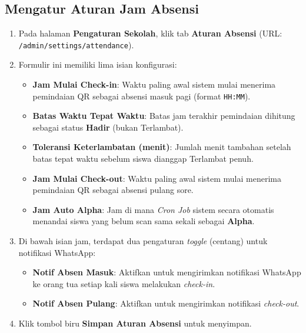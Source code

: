 \subsection{Mengatur Aturan Jam Absensi}
\begin{enumerate}
    \item Pada halaman \textbf{Pengaturan Sekolah}, klik tab \textbf{Aturan Absensi} (URL: \texttt{/admin/settings/attendance}).
    \item Formulir ini memiliki lima isian konfigurasi:
    \begin{itemize}
        \item \textbf{Jam Mulai Check-in}: Waktu paling awal sistem mulai menerima pemindaian QR sebagai absensi masuk pagi (format \texttt{HH:MM}).
        \item \textbf{Batas Waktu Tepat Waktu}: Batas jam terakhir pemindaian dihitung sebagai status \textbf{Hadir} (bukan Terlambat).
        \item \textbf{Toleransi Keterlambatan (menit)}: Jumlah menit tambahan setelah batas tepat waktu sebelum siswa dianggap Terlambat penuh.
        \item \textbf{Jam Mulai Check-out}: Waktu paling awal sistem mulai menerima pemindaian QR sebagai absensi pulang sore.
        \item \textbf{Jam Auto Alpha}: Jam di mana \textit{Cron Job} sistem secara otomatis menandai siswa yang belum scan sama sekali sebagai \textbf{Alpha}.
    \end{itemize}
    \item Di bawah isian jam, terdapat dua pengaturan \textit{toggle} (centang) untuk notifikasi WhatsApp:
    \begin{itemize}
        \item \textbf{Notif Absen Masuk}: Aktifkan untuk mengirimkan notifikasi WhatsApp ke orang tua setiap kali siswa melakukan \textit{check-in}.
        \item \textbf{Notif Absen Pulang}: Aktifkan untuk mengirimkan notifikasi \textit{check-out}.
    \end{itemize}
    \item Klik tombol biru \textbf{Simpan Aturan Absensi} untuk menyimpan.
\end{enumerate}

